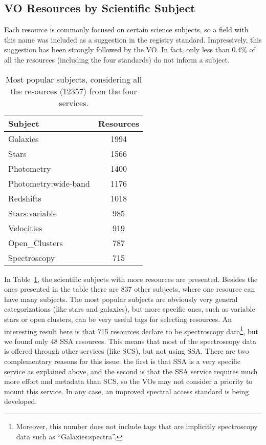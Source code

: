 \subsection{VO Resources by Scientific Subject}

Each resource is commonly focused on certain science subjects, so a field with this name was included
as a suggestion in the registry standard. Impressively, this suggestion has been strongly followed by the VO.
In fact, only less than 0.4\% of all the resources (including the four standards) do not inform a subject. 

\begin{table}
\begin{center}
\begin{tabular}{|l|c|}
\hline
\textbf{Subject} & \textbf{Resources} \\
\hline
Galaxies  &  1994  \\
Stars  &  1566  \\
Photometry  &  1400  \\
Photometry:wide-band  &  1176  \\
Redshifts  &  1018  \\
Stars:variable  &  985  \\
Velocities  &  919  \\
Open\_Clusters  &  787  \\
Spectroscopy  &  715  \\
\hline
\end{tabular}
\label{tab:resSub}
\caption{Most popular subjects, considering all the resources (12357) from the four services.}
\end{center}
\end{table}

In Table~\ref{tab:resSub}, the scientific subjects with more resources are presented. Besides the ones
presented in the table there are 837 other subjects, where one resource can have many subjects. 
The most popular subjects are obviously very general categorizations (like stars and galaxies), but
more specific ones, such as variable stars or open clusters, can be very useful tags for selecting
resources. An interesting result here is that 715 resources declare to be spectroscopy data\footnote{Moreover, this number does not include tags that are implicitly spectroscopy data such as ``Galaxies:spectra''.}, but we
found only 48 SSA resources. This means that most of the spectroscopy data is offered through other
services (like SCS), but not using SSA. There are two complementary reasons for this issue: the first
is that SSA is a very specific service as explained above, and the second is that the SSA service requires
much more effort and metadata than SCS, so the VOs may not consider a priority to mount this service.
In any case, an improved spectral access standard is being developed.

